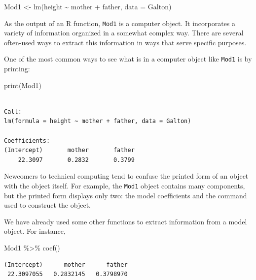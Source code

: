 \documentclass[
  letterpaper,
  DIV=11,
  numbers=noendperiod,
  oneside]{scrreprt}
\newenvironment{Shaded}{\begin{snugshade}}{\end{snugshade}}
\newcommand{\AttributeTok}[1]{\textcolor[rgb]{0.40,0.45,0.13}{#1}}
\newcommand{\FunctionTok}[1]{\textcolor[rgb]{0.28,0.35,0.67}{#1}}
\newcommand{\NormalTok}[1]{\textcolor[rgb]{0.00,0.23,0.31}{#1}}
\newcommand{\OtherTok}[1]{\textcolor[rgb]{0.00,0.23,0.31}{#1}}
\newcommand{\SpecialCharTok}[1]{\textcolor[rgb]{0.37,0.37,0.37}{#1}}
\begin{document}
\begin{Shaded}
\begin{Highlighting}[]
\NormalTok{Mod1 }\OtherTok{\textless{}{-}} \FunctionTok{lm}\NormalTok{(height }\SpecialCharTok{\textasciitilde{}}\NormalTok{ mother }\SpecialCharTok{+}\NormalTok{ father, }\AttributeTok{data =}\NormalTok{ Galton)}
\end{Highlighting}
\end{Shaded}

As the output of an R function, \texttt{Mod1} is a computer object. It
incorporates a variety of information organized in a somewhat complex
way. There are several often-used ways to extract this information in
ways that serve specific purposes.

One of the most common ways to see what is in a computer object like
\texttt{Mod1} is by printing:

\begin{Shaded}
\begin{Highlighting}[]
\FunctionTok{print}\NormalTok{(Mod1)}
\end{Highlighting}
\end{Shaded}

\begin{verbatim}

Call:
lm(formula = height ~ mother + father, data = Galton)

Coefficients:
(Intercept)       mother       father  
    22.3097       0.2832       0.3799  
\end{verbatim}

Newcomers to technical computing tend to confuse the printed form of an
object with the object itself. For example, the \texttt{Mod1} object
contains many components, but the printed form displays only two: the
model coefficients and the command used to construct the object.

We have already used some other functions to extract information from a
model object. For instance,

\begin{Shaded}
\begin{Highlighting}[]
\NormalTok{Mod1 }\SpecialCharTok{\%\textgreater{}\%} \FunctionTok{coef}\NormalTok{()}
\end{Highlighting}
\end{Shaded}

\begin{verbatim}
(Intercept)      mother      father 
 22.3097055   0.2832145   0.3798970 
\end{verbatim}
\end{document}
